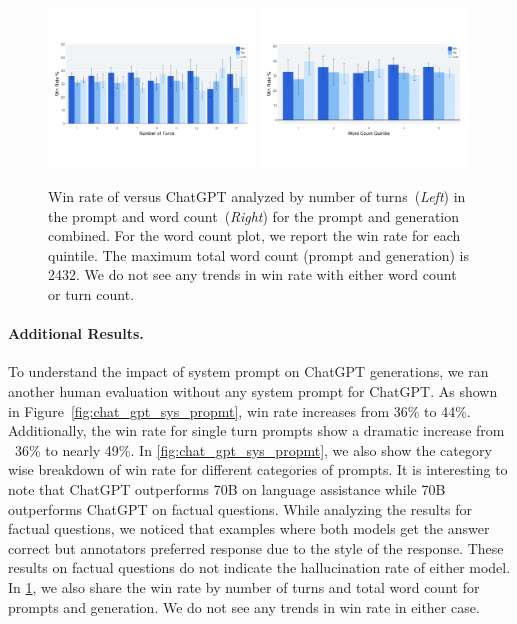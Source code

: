 \begin{figure}
    \centering
    \includegraphics[width=0.49\textwidth]{img/human_evals/chatgpt_win_rate_turn_count.pdf}
    \includegraphics[width=0.49\textwidth]{img/human_evals/chatgpt_win_rate_word_count.pdf}
    \caption{Win rate of \modelname versus ChatGPT analyzed by number of turns~(\textit{Left}) in the prompt and word count~(\textit{Right}) for the prompt and generation combined. For the word count plot, we report the win rate for each quintile. The maximum total word count (prompt and generation) is 2432. We do not see any trends in win rate with either word count or turn count.}
    \label{fig:win_rate_length}
\end{figure}

\paragraph{Additional Results.}

To understand the impact of system prompt on ChatGPT generations, we ran another human evaluation without any system prompt for ChatGPT. 
As shown in Figure~\ref{fig:chat_gpt_sys_propmt}, \modelname win rate increases from 36\% to 44\%. Additionally, the win rate for single turn prompts show a dramatic increase from ~36\% to nearly 49\%.  In \ref{fig:chat_gpt_sys_propmt}, we also show the category wise breakdown of win rate for different categories of prompts.  It is interesting to note that ChatGPT outperforms \modelname 70B on language assistance while \modelname 70B outperforms ChatGPT on factual questions. While analyzing the results for factual questions, we noticed that examples where both models get the answer correct but annotators preferred \modelname response due to the style of the response. These results on factual questions do not indicate the hallucination rate of either model. In \ref{fig:win_rate_length}, we also share the win rate by number of turns and total word count for prompts and generation. We do not see any trends in win rate in either case.



